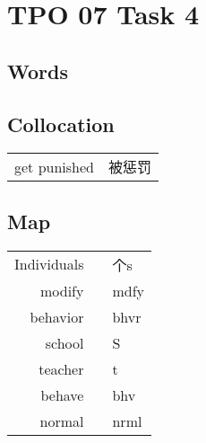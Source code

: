 \section{TPO 07 Task 4}

\subsection{Words}

\subsection{Collocation}

\begin{tabular}{ll}
    get punished & 被惩罚 \\
\end{tabular}

\subsection{Map}

\begin{tabular}{rc@{\quad$\to$\quad}l}
    Individuals &  & 个s              \\
    modify      &  & mdfy            \\
    behavior    &  & bhvr            \\
    school      &  & \textcircled{S} \\
    teacher     &  & t               \\
    behave      &  & bhv             \\
    normal      &  & nrml            \\
\end{tabular}

\newpage
